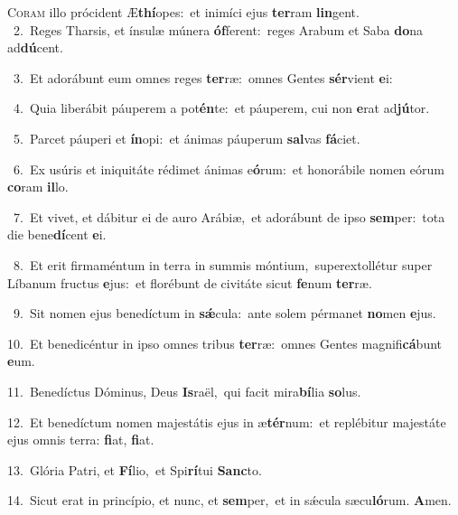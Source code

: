 \lettrine{\initial\textcolor{\initialcolor}{C}}{oram} illo prócident Æ\-\textbf{thí}\-opes:~\star et inimíci ejus \textbf{ter}\-ram \textbf{lin}\-gent.\\
{\numbfont\textcolor{\numbcolor}{~2.}}~Reges Tharsis, et ínsulæ múnera \textbf{óf}\-ferent:~\star reges Arabum et Saba \textbf{do}\-na ad\-\textbf{dú}\-cent.\par
{\numbfont\textcolor{\numbcolor}{~3.}}~Et adorábunt eum omnes reges \textbf{ter}\-ræ:~\star omnes Gentes \textbf{sér}\-vient \textbf{e}\-i:\par
{\numbfont\textcolor{\numbcolor}{~4.}}~Quia liberábit páuperem a pot\-\textbf{én}\-te:~\star et páuperem, cui non \textbf{e}\-rat ad\-\textbf{jú}\-tor.\par
{\numbfont\textcolor{\numbcolor}{~5.}}~Parcet páuperi et \textbf{ín}\-opi:~\star et ánimas páuperum \textbf{sal}\-vas \textbf{fá}\-ciet.\par
{\numbfont\textcolor{\numbcolor}{~6.}}~Ex usúris et iniquitáte rédimet ánimas e\-\textbf{ó}\-rum:~\star et honorábile nomen eórum \textbf{co}\-ram \textbf{il}\-lo.\par
{\numbfont\textcolor{\numbcolor}{~7.}}~Et vivet, et dábitur ei de auro Arábiæ,~\dagger et adorábunt de ipso \textbf{sem}\-per:~\star tota die bene\-\textbf{dí}\-cent \textbf{e}\-i.\par
{\numbfont\textcolor{\numbcolor}{~8.}}~Et erit firmaméntum in terra in summis móntium,~\dagger superextollétur super Líbanum fructus \textbf{e}\-jus:~\star et florébunt de civitáte sicut \textbf{fe}\-num \textbf{ter}\-ræ.\par
{\numbfont\textcolor{\numbcolor}{~9.}}~Sit nomen ejus benedíctum in \textbf{sǽ}\-cula:~\star ante solem pérmanet \textbf{no}\-men \textbf{e}\-jus.\par
{\numbfont\textcolor{\numbcolor}{10.}}~Et benedicéntur in ipso omnes tribus \textbf{ter}\-ræ:~\star omnes Gentes magnifi\-\textbf{cá}\-bunt \textbf{e}\-um.\par
{\numbfont\textcolor{\numbcolor}{11.}}~Benedíctus Dóminus, Deus \textbf{Is}\-raël,~\star qui facit mira\-\textbf{bí}\-lia \textbf{so}\-lus.\par
{\numbfont\textcolor{\numbcolor}{12.}}~Et benedíctum nomen majestátis ejus in æ\-\textbf{tér}\-num:~\star et replébitur majestáte ejus omnis terra: \textbf{fi}\-at, \textbf{fi}\-at.\par
{\numbfont\textcolor{\numbcolor}{13.}}~Glória Patri, et \textbf{Fí}\-lio,~\star et Spi\-\textbf{rí}\-tui \textbf{Sanc}\-to.\par
{\numbfont\textcolor{\numbcolor}{14.}}~Sicut erat in princípio, et nunc, et \textbf{sem}\-per,~\star et in sǽcula sæcu\-\textbf{ló}\-rum. \textbf{A}\-men.\par
